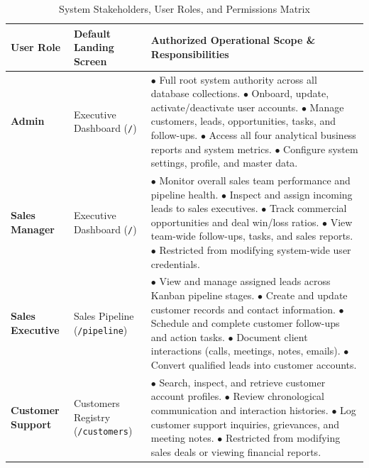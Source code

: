 \begin{table}[h!]
\centering
\caption{System Stakeholders, User Roles, and Permissions Matrix}
\label{tab:user_roles}
\renewcommand{\arraystretch}{1.3}
\begin{tabular}{|p{3cm}|p{3.5cm}|p{7.5cm}|}
\hline
\textbf{User Role} & \textbf{Default Landing Screen} & \textbf{Authorized Operational Scope \& Responsibilities} \\ \hline
\textbf{Admin} & Executive Dashboard (\texttt{/}) & 
$\bullet$ Full root system authority across all database collections.\newline
$\bullet$ Onboard, update, activate/deactivate user accounts.\newline
$\bullet$ Manage customers, leads, opportunities, tasks, and follow-ups.\newline
$\bullet$ Access all four analytical business reports and system metrics.\newline
$\bullet$ Configure system settings, profile, and master data. \\ \hline
\textbf{Sales Manager} & Executive Dashboard (\texttt{/}) & 
$\bullet$ Monitor overall sales team performance and pipeline health.\newline
$\bullet$ Inspect and assign incoming leads to sales executives.\newline
$\bullet$ Track commercial opportunities and deal win/loss ratios.\newline
$\bullet$ View team-wide follow-ups, tasks, and sales reports.\newline
$\bullet$ Restricted from modifying system-wide user credentials. \\ \hline
\textbf{Sales Executive} & Sales Pipeline (\texttt{/pipeline}) & 
$\bullet$ View and manage assigned leads across Kanban pipeline stages.\newline
$\bullet$ Create and update customer records and contact information.\newline
$\bullet$ Schedule and complete customer follow-ups and action tasks.\newline
$\bullet$ Document client interactions (calls, meetings, notes, emails).\newline
$\bullet$ Convert qualified leads into customer accounts. \\ \hline
\textbf{Customer Support} & Customers Registry (\texttt{/customers}) & 
$\bullet$ Search, inspect, and retrieve customer account profiles.\newline
$\bullet$ Review chronological communication and interaction histories.\newline
$\bullet$ Log customer support inquiries, grievances, and meeting notes.\newline
$\bullet$ Restricted from modifying sales deals or viewing financial reports. \\ \hline
\end{tabular}
\end{table}

